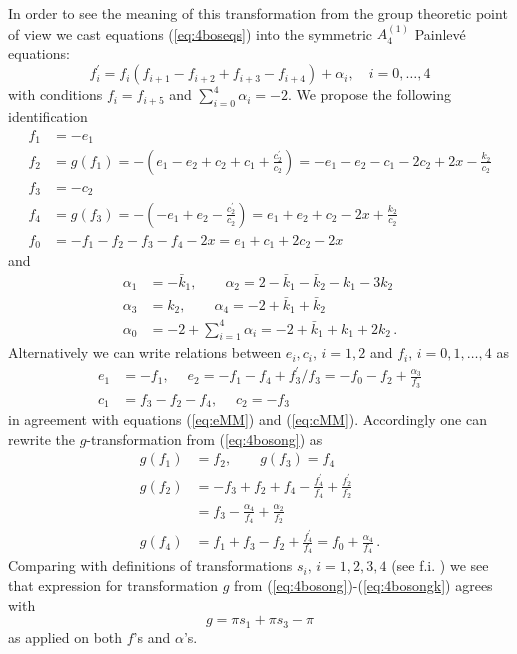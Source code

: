 \documentclass[12pt]{article}
\numberwithin{equation}{section}
\def\rf#1{(\ref{eq:#1})}
\def\lab#1{\label{eq:#1}}
\begin{document}
In order to see the meaning of this transformation from the 
group theoretic point of view we cast equations \rf{4boseqs} into the symmetric $A^{(1)}_4$ Painlev\'e equations:
\begin{equation} 
f_i^{\prime} = f_i (f_{i+1}- f_{i+2} + f_{i+3} - f_{i+4} ) + \alpha_i, \quad i=0,\ldots,4 
\lab{a14painleve}
\end{equation}
with conditions $f_i=f_{i+5}$ and $\sum_{i=0}^4\alpha_i=-2$. 
We propose the following identification
\[  \begin{split}
f_1 &=-e_1\\
f_2&=g (f_1)=- \left(e_{1}-e_2 +c_2+c_{1} + \frac{c_2^{\prime}}{c_2}\right)=
-e_1-e_2-c_1-2c_2+2x-\frac{k_2}{c_2} \\
f_3&=-c_2 \\
f_4&=g(f_3)= -\left(-e_{1} + e_2-\frac{c_2^{\prime}}{c_2}\right) =
e_{1} + e_2+c_2-2x+\frac{k_2}{c_2}\\
f_0&=-f_1 -f_2-f_3-f_4-2x=e_1+c_1+2c_2-2x
\end{split}
\]
and
\[  \begin{split}
\alpha_1 &=-{\bar k}_1,\qquad
\alpha_2=2-  {\bar k}_1- {\bar k}_2-k_1-3k_2   \\
\alpha_3&=k_2, \qquad
\alpha_4=-2 +{\bar k}_1  +{\bar k}_2\\
\alpha_0&=-2 +\sum_{i=1}^4 \alpha_i = -2 +{\bar k}_1+k_1+2k_2  \, .
\end{split}
\]
Alternatively we can write relations between  
$e_i, c_i,\,i=1,2$ and $f_i,\,i=0, 1,{\ldots},4$ as
\begin{equation}
\begin{split}
e_1&=-f_1,\;\quad e_2=-f_1 -f_4+f_3^\prime/f_3
=-f_0-f_2+\frac{\alpha_3}{f_3}\\
c_1&=f_3-f_2-f_4, \; \quad c_2=-f_3
\end{split}
\lab{ecf4bose}
\end{equation}
in agreement with equations \rf{eMM} and \rf{cMM}.
Accordingly one can rewrite the $g$-transformation from \rf{4bosong}
as
\begin{equation}
\begin{split}
g(f_1)&=f_2, \qquad g( f_3)=f_4\\
g( f_2)&= -f_3+f_2+f_4-\frac{f_4^{\prime}}{f_4}+
\frac{f_2^{\prime}}{f_2} \\
&=f_3-\frac{\alpha_4}{f_4}+\frac{\alpha_2}{f_2}\\
g( f_4)&= f_1+f_3-f_2+\frac{f_4^{\prime}}{f_4}
=f_0+\frac{\alpha_4}{f_4}\, .
\end{split}
\lab{4bosongf}
\end{equation}
Comparing with definitions of transformations $s_i, \, i=1,2,3,4$
(see f.i. \cite{noumibk}) we see that expression 
for transformation $g$ from \rf{4bosong}-\rf{4bosongk} agrees with
\[
g = \pi s_1+\pi s_3-\pi
\]
as applied on both $f$'s and $\alpha$'s.
\end{document}
